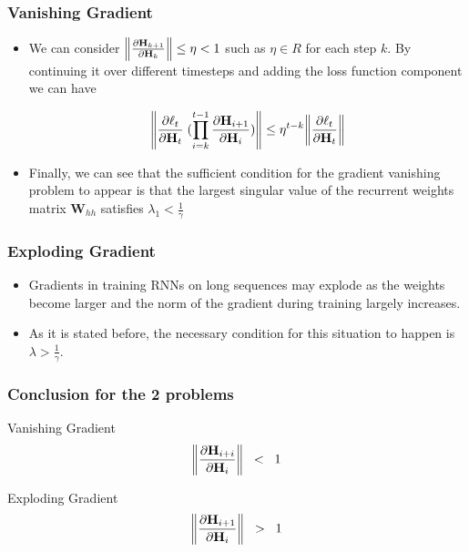 \documentclass[
	11pt,
]{beamer}
\begin{document}
\begin{frame}
	\frametitle{Vanishing Gradient}
	\begin{itemize}
		\item We can consider $\norm{\pdv{\mathbf{H}_{k+1}}{\mathbf{H}_k}} \le \eta < 1$ such as $\eta \in R$ for each
		step $k$. By continuing it over different timesteps and adding
		the loss function component we can have
		\bigskip
	\begin{block}{}
		\begin{equation*}
			\norm{\pdv{\ell_t}{\mathbf{H}_t} \; (\prod_{i=k}^{t-1} \pdv{\mathbf{H}_{i+1}}{\mathbf{H}_i})} \le \eta^{t-k}  \norm{\pdv{\ell_t}{\mathbf{H}_t}}
		\end{equation*}
	\end{block}
		\bigskip
		\item Finally, we can see that the sufficient condition for
		the gradient vanishing problem to appear is that the largest
		singular value of the recurrent weights matrix $\mathbf{W}_{hh}$
		satisfies $\lambda_1 < \frac{1}{\gamma}$
\end{itemize}
\end{frame}

\begin{frame}
	\frametitle{Exploding Gradient}
	\begin{itemize}
		\item Gradients in training RNNs on long sequences
		may explode as the weights become larger and the norm of
		the gradient during training largely increases.
		\bigskip
		\item  As it is stated before, the necessary condition for this situation to happen is
		$\lambda > \frac{1}{\gamma}$.
	\end{itemize}
\end{frame}

\begin{frame}
	\frametitle{Conclusion for the 2 problems}
	\begin{block}{Vanishing Gradient}
		\begin{equation*}
			 \norm{\pdv{\mathbf{H}_{i+i}}{\mathbf{H}_i}} \;\; < \;\; 1
		\end{equation*}
	\end{block}
	\bigskip
	\bigskip
	\begin{block}{Exploding Gradient}
		\begin{equation*}
			\norm{\pdv{\mathbf{H}_{i+1}}{\mathbf{H}_i}} \;\; > \;\; 1
		\end{equation*}
	\end{block}
\end{frame}
\end{document}
